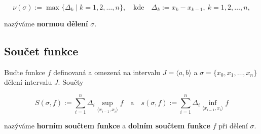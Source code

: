 \documentclass{szzclass}
\begin{document}
\begin{equation*}
\nu(\sigma) := \max \{ \Delta_k \mid k = 1,2,\ldots,n \}, \quad \text{kde} \quad \Delta_k := x_k - x_{k-1}, \ k = 1,2,\ldots,n,\end{equation*}

nazýváme \textbf{normou dělení} $\sigma$.

\subsection{Součet funkce}
Buďte funkce $f$ definovaná a omezená na intervalu $J=\langle a,b \rangle$ a $\sigma=\{x_0,x_1,…,x_n\}$ dělení intervalu $J$. Součty

\begin{equation*}
S(\sigma,f) := \sum_{i=1}^n \Delta_i \sup_{\langle x_{i-1},x_i\rangle} f \quad \text{a} \quad s(\sigma,f) := \sum_{i=1}^n \Delta_i \inf_{\langle x_{i-1},x_i\rangle} f\end{equation*}

nazýváme \textbf{horním součtem funkce} a \textbf{dolním součtem funkce} $f$ při dělení $\sigma$.
\end{document}
